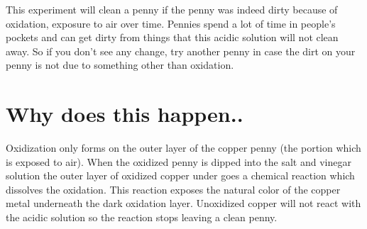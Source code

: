 \documentclass[12pt,twoside,a4]{article}
\begin{document}
This experiment will clean a penny if the penny was indeed dirty because of oxidation, exposure to air over time.  Pennies spend a lot of time in people's pockets and can get dirty from things that this acidic solution will not clean away.  So if you don't see any change, try another penny in case the dirt on your penny is not due to something other than oxidation.

\section{Why does this happen..}

Oxidization only forms on the outer layer of the copper penny (the portion which is exposed to air).  When the oxidized penny is dipped into the salt and vinegar solution the outer layer of oxidized copper under goes a chemical reaction which dissolves the oxidation.  This reaction exposes the natural color of the copper metal underneath the dark oxidation layer.  Unoxidized copper will not react with the acidic solution so the reaction stops leaving a clean penny.
\end{document}
